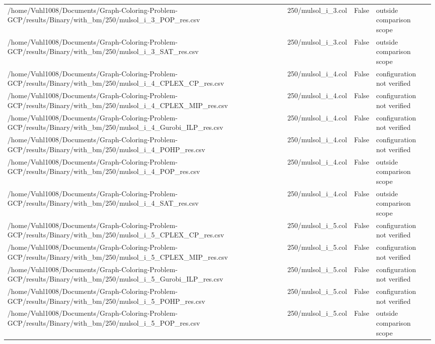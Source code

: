 \begin{table}[htbp]
\begin{tabular}{llll}
/home/Vuhl1008/Documents/Graph-Coloring-Problem-GCP/results/Binary/with\_bm/250/mulsol\_i\_3\_POP\_res.csv & 250/mulsol\_i\_3.col & False & outside comparison scope \\
/home/Vuhl1008/Documents/Graph-Coloring-Problem-GCP/results/Binary/with\_bm/250/mulsol\_i\_3\_SAT\_res.csv & 250/mulsol\_i\_3.col & False & outside comparison scope \\
/home/Vuhl1008/Documents/Graph-Coloring-Problem-GCP/results/Binary/with\_bm/250/mulsol\_i\_4\_CPLEX\_CP\_res.csv & 250/mulsol\_i\_4.col & False & configuration not verified \\
/home/Vuhl1008/Documents/Graph-Coloring-Problem-GCP/results/Binary/with\_bm/250/mulsol\_i\_4\_CPLEX\_MIP\_res.csv & 250/mulsol\_i\_4.col & False & configuration not verified \\
/home/Vuhl1008/Documents/Graph-Coloring-Problem-GCP/results/Binary/with\_bm/250/mulsol\_i\_4\_Gurobi\_ILP\_res.csv & 250/mulsol\_i\_4.col & False & configuration not verified \\
/home/Vuhl1008/Documents/Graph-Coloring-Problem-GCP/results/Binary/with\_bm/250/mulsol\_i\_4\_POHP\_res.csv & 250/mulsol\_i\_4.col & False & configuration not verified \\
/home/Vuhl1008/Documents/Graph-Coloring-Problem-GCP/results/Binary/with\_bm/250/mulsol\_i\_4\_POP\_res.csv & 250/mulsol\_i\_4.col & False & outside comparison scope \\
/home/Vuhl1008/Documents/Graph-Coloring-Problem-GCP/results/Binary/with\_bm/250/mulsol\_i\_4\_SAT\_res.csv & 250/mulsol\_i\_4.col & False & outside comparison scope \\
/home/Vuhl1008/Documents/Graph-Coloring-Problem-GCP/results/Binary/with\_bm/250/mulsol\_i\_5\_CPLEX\_CP\_res.csv & 250/mulsol\_i\_5.col & False & configuration not verified \\
/home/Vuhl1008/Documents/Graph-Coloring-Problem-GCP/results/Binary/with\_bm/250/mulsol\_i\_5\_CPLEX\_MIP\_res.csv & 250/mulsol\_i\_5.col & False & configuration not verified \\
/home/Vuhl1008/Documents/Graph-Coloring-Problem-GCP/results/Binary/with\_bm/250/mulsol\_i\_5\_Gurobi\_ILP\_res.csv & 250/mulsol\_i\_5.col & False & configuration not verified \\
/home/Vuhl1008/Documents/Graph-Coloring-Problem-GCP/results/Binary/with\_bm/250/mulsol\_i\_5\_POHP\_res.csv & 250/mulsol\_i\_5.col & False & configuration not verified \\
/home/Vuhl1008/Documents/Graph-Coloring-Problem-GCP/results/Binary/with\_bm/250/mulsol\_i\_5\_POP\_res.csv & 250/mulsol\_i\_5.col & False & outside comparison scope \\

\end{tabular}
\end{table}
